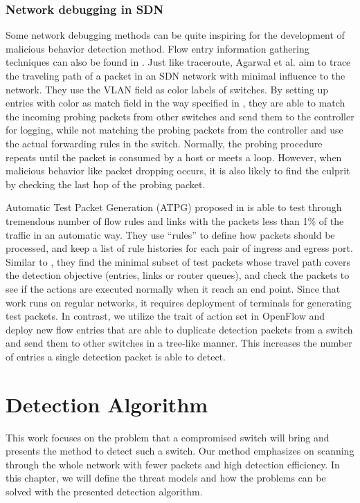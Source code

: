 \documentclass[conference]{IEEEtran}
\begin{document}
\subsubsection{Network debugging in SDN}
Some network debugging methods can be quite inspiring for the development of malicious behavior detection method. Flow entry information gathering techniques can also be found in \cite{ARDC14}. Just like traceroute, Agarwal et al. aim to trace the traveling path of a packet in an SDN network with minimal influence to the network. They use the VLAN field as color labels of switches. By setting up entries with color as match field in the way specified in \cite{ARDC14}, they are able to match the incoming probing packets from other switches and send them to the controller for logging, while not matching the probing packets from the controller and use the actual forwarding rules in the switch. Normally, the probing procedure repeats until the packet is consumed by a host or meets a loop. However, when malicious behavior like packet dropping occurs, it is also likely to find the culprit by checking the last hop of the probing packet.

Automatic Test Packet Generation (ATPG) proposed in \cite{ZKVM12} is able to test through tremendous number of flow rules and links with the packets less than 1\% of the traffic in an automatic way. They use ``rules'' to define how packets should be processed, and keep a list of rule histories for each pair of ingress and egress port. Similar to \cite{PJL16}, they find the minimal subset of test packets whose travel path covers the detection objective (entries, links or router queues), and check the packets to see if the actions are executed normally when it reach an end point. Since that work runs on regular networks, it requires deployment of terminals for generating test packets. In contrast, we utilize the trait of action set in OpenFlow and deploy new flow entries that are able to duplicate detection packets from a switch and send them to other switches in a tree-like manner. This increases the number of entries a single detection packet is able to detect. 

\section{Detection Algorithm}
This work focuses on the problem that a compromised switch will bring and presents the method to detect such a switch. Our method emphasizes on scanning through the whole network with fewer packets and high detection efficiency. In this chapter, we will define the threat models and how the problems can be solved with the presented detection algorithm.
\end{document}
